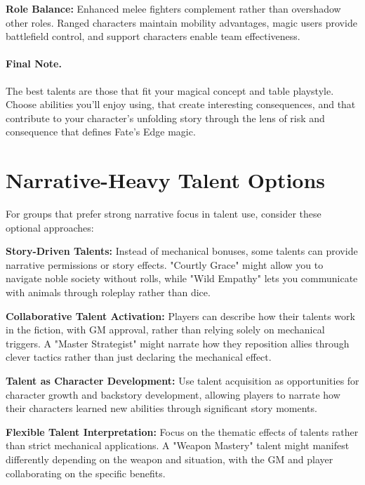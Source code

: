 \textbf{Role Balance:} Enhanced melee fighters complement rather than overshadow other roles. Ranged characters maintain mobility advantages, magic users provide battlefield control, and support characters enable team effectiveness.


\paragraph{Final Note.}
The best talents are those that fit your magical concept and table playstyle. Choose abilities you'll enjoy using, that create interesting consequences, and that contribute to your character's unfolding story through the lens of risk and consequence that defines Fate's Edge magic.

\section{Narrative-Heavy Talent Options}

For groups that prefer strong narrative focus in talent use, consider these optional approaches:

\textbf{Story-Driven Talents:} Instead of mechanical bonuses, some talents can provide narrative permissions or story effects. "Courtly Grace" might allow you to navigate noble society without rolls, while "Wild Empathy" lets you communicate with animals through roleplay rather than dice.

\textbf{Collaborative Talent Activation:} Players can describe how their talents work in the fiction, with GM approval, rather than relying solely on mechanical triggers. A "Master Strategist" might narrate how they reposition allies through clever tactics rather than just declaring the mechanical effect.

\textbf{Talent as Character Development:} Use talent acquisition as opportunities for character growth and backstory development, allowing players to narrate how their characters learned new abilities through significant story moments.

\textbf{Flexible Talent Interpretation:} Focus on the thematic effects of talents rather than strict mechanical applications. A "Weapon Mastery" talent might manifest differently depending on the weapon and situation, with the GM and player collaborating on the specific benefits.
